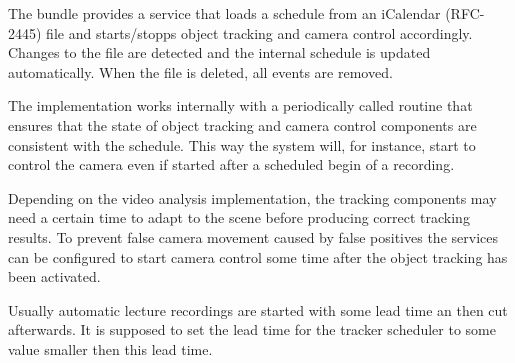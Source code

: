
The bundle provides a service that loads a schedule from an iCalendar (RFC-2445) file and starts/stopps object tracking and camera control accordingly. Changes to the file are detected and the internal schedule is updated automatically. When the file is deleted, all events are removed.

The implementation works internally with a periodically called routine that ensures that the state of object tracking and camera control components are consistent with the schedule. This way the system will, for instance, start to control the camera even if started after a scheduled begin of a recording.

Depending on the video analysis implementation, the tracking components may need a certain time to adapt to the scene before producing correct tracking results. To prevent false camera movement caused by false positives the services can be configured to start camera control some time after the object tracking has been activated. 

Usually automatic lecture recordings are started with some lead time an then cut afterwards. It is supposed to set the lead time for the tracker scheduler to some value smaller then this lead time.

\configproperties







